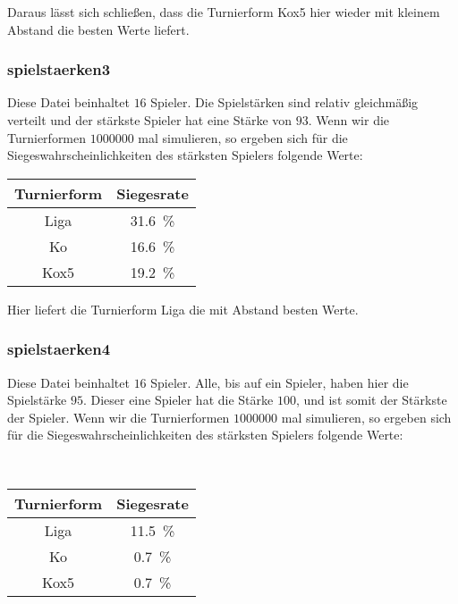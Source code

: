 \documentclass[a4paper, 12pt]{scrartcl}
\begin{document}
Daraus lässt sich schließen, dass die Turnierform Kox5 hier wieder mit kleinem Abstand die besten Werte liefert.

\subsubsection{spielstaerken3}

Diese Datei beinhaltet $16$ Spieler. Die Spielstärken sind relativ gleichmäßig verteilt und der stärkste Spieler hat eine Stärke von $93$.
Wenn wir die Turnierformen $1000000$ mal simulieren, so ergeben sich für die Siegeswahrscheinlichkeiten des stärksten Spielers folgende Werte:

\begin{table}[H]
    \centering
\begin{tabular}{@{}cc@{}}
\toprule
Turnierform & Siegesrate                \\ \midrule
Liga        & \SI{31.6}{\percent}       \\
    Ko          & \SI{16.6}{\percent}       \\
    Kox5        & \SI{19.2}{\percent}       \\ \bottomrule
\end{tabular}
\end{table}

Hier liefert die Turnierform Liga die mit Abstand besten Werte.

\subsubsection{spielstaerken4}

Diese Datei beinhaltet $16$ Spieler. Alle, bis auf ein Spieler, haben hier die Spielstärke $95$. Dieser eine Spieler hat die Stärke $100$, und ist somit der Stärkste der Spieler.
Wenn wir die Turnierformen $1000000$ mal simulieren, so ergeben sich für die Siegeswahrscheinlichkeiten des stärksten Spielers folgende Werte:

\

\begin{table}[H]
    \centering
\begin{tabular}{@{}cc@{}}
\toprule
Turnierform & Siegesrate                \\ \midrule
Liga        & \SI{11.5}{\percent}       \\
    Ko          & \SI{0.7}{\percent}       \\
    Kox5        & \SI{0.7}{\percent}       \\ \bottomrule
\end{tabular}
\end{table}
\end{document}
